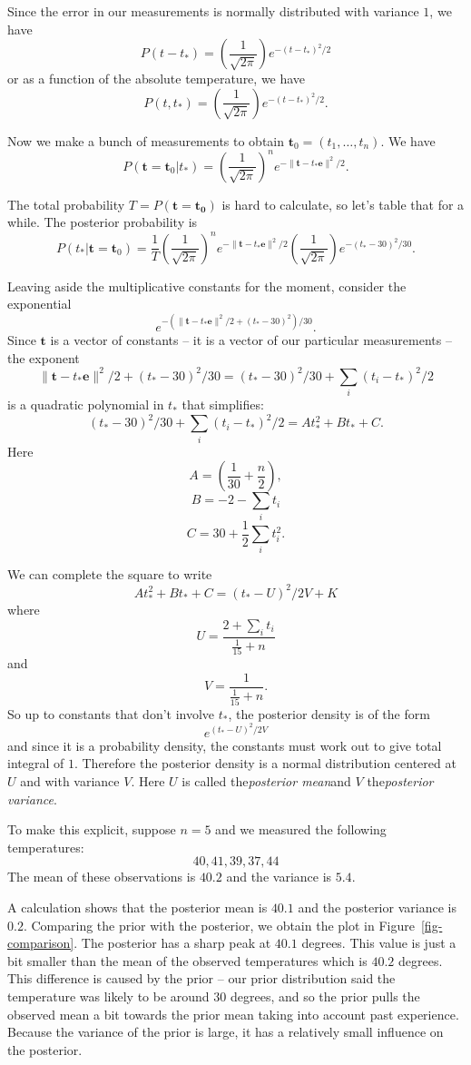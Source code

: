 \documentclass[
  11pt,
  letterpaper,
]{scrbook}
\theoremstyle{plain}
\theoremstyle{plain}
\theoremstyle{remark}
\begin{document}
Since the error in our measurements is normally distributed with
variance \(1\), we have \[
P(t-t_{*})=\left(\frac{1}{\sqrt{2\pi}}\right)e^{-(t-t_{*})^2/2}
\] or as a function of the absolute temperature, we have \[
P(t,t_{*}) = \left(\frac{1}{\sqrt{2\pi}}\right)e^{-(t-t_*)^2/2}.
\]

Now we make a bunch of measurements to obtain
\(\mathbf{t}_0=(t_1,\ldots, t_n)\). We have \[
P(\mathbf{t}=\mathbf{t}_0|t_{*}) = \left(\frac{1}{\sqrt{2\pi}}\right)^ne^{-\|\mathbf{t}-t_*\mathbf{e}\|^2/2}.
\]

The total probability \(T=P(\mathbf{t}=\mathbf{t_0})\) is hard to
calculate, so let's table that for a while. The posterior probability is
\[
P(t_{*}|\mathbf{t}=\mathbf{t}_{0}) = \frac{1}{T}
\left(\frac{1}{\sqrt{2\pi}}\right)^ne^{-\|\mathbf{t}-t_*\mathbf{e}\|^2/2}
\left(\frac{1}{\sqrt{2\pi}}\right)e^{-(t_*-30)^2/30}.
\]

Leaving aside the multiplicative constants for the moment, consider the
exponential \[
e^{-(\|\mathbf{t}-t_{*}\mathbf{e}\|^2/2+(t_{*}-30)^2)/30}.
\] Since \(\mathbf{t}\) is a vector of constants -- it is a vector of
our particular measurements -- the exponent \[
\|\mathbf{t}-t_{*}\mathbf{e}\|^2/2+(t_{*}-30)^2/30 = (t_{*}-30)^2/30+\sum_{i} (t_{i}-t_{*})^2/2
\] is a quadratic polynomial in \(t_{*}\) that simplifies: \[
(t_{*}-30)^2/30+\sum_{i} (t_{i}-t_{*})^2/2 = At_{*}^2+Bt_{*}+C.
\] Here \[
A=(\frac{1}{30}+\frac{n}{2}),
\] \[
B=-2-\sum_{i} t_{i}
\] \[
C=30+\frac{1}{2}\sum_{i} t_{i}^2.
\]

We can complete the square to write \[
At_{*}^2+Bt_{*}+C = (t_{*}-U)^2/2V +K
\] where \[
U=\frac{2+\sum_{i}t_{i}}{\frac{1}{15}+n}
\] and \[
V=\frac{1}{\frac{1}{15}+n}.
\] So up to constants that don't involve \(t_{*}\), the posterior
density is of the form \[
e^{(t_{*}-U)^2/2V}
\] and since it is a probability density, the constants must work out to
give total integral of \(1\). Therefore the posterior density is a
normal distribution centered at \(U\) and with variance \(V\). Here
\(U\) is called the\emph{posterior mean}and \(V\) the\emph{posterior
variance}.

To make this explicit, suppose \(n=5\) and we measured the following
temperatures: \[
40, 41,39, 37, 44
\] The mean of these observations is \(40.2\) and the variance is
\(5.4\).

A calculation shows that the posterior mean is \(40.1\) and the
posterior variance is \(0.2\). Comparing the prior with the posterior,
we obtain the plot in Figure~\ref{fig-comparison}. The posterior has a
sharp peak at \(40.1\) degrees. This value is just a bit smaller than
the mean of the observed temperatures which is \(40.2\) degrees. This
difference is caused by the prior -- our prior distribution said the
temperature was likely to be around \(30\) degrees, and so the prior
pulls the observed mean a bit towards the prior mean taking into account
past experience. Because the variance of the prior is large, it has a
relatively small influence on the posterior.
\end{document}
